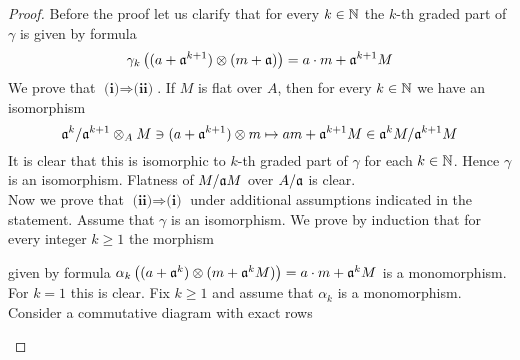 \begin{proof}
Before the proof let us clarify that for every $k\in {\mathbb N}$ the $k$-th graded part of $\gamma$ is given by formula
$$\gamma_k\left((a+\mathfrak{a}^{k+1})\otimes (m+\mathfrak{a})\right) = a\cdot m +\mathfrak{a}^{k+1}M$$
We prove that $\textbf{(i)}\Rightarrow \textbf{(ii)}$. If $M$ is flat over $A$, then for every $k\in {\mathbb N}$ we have an isomorphism 
$$\mathfrak{a}^{k}/\mathfrak{a}^{k+1}\otimes_AM\ni (a+\mathfrak{a}^{k+1})\otimes m \mapsto am+\mathfrak{a}^{k+1}M \in \mathfrak{a}^kM/\mathfrak{a}^{k+1}M$$
It is clear that this is isomorphic to $k$-th graded part of $\gamma$ for each $k\in {\mathbb N}$. Hence $\gamma$ is an isomorphism. Flatness of $M/\mathfrak{a}M$ over $A/\mathfrak{a}$ is clear.\\
Now we prove that $\textbf{(ii)}\Rightarrow \textbf{(i)}$ under additional assumptions indicated in the statement. Assume that $\gamma$ is an isomorphism. We prove by induction that for every integer $k\geq 1$ the morphism
\begin{center}
\end{center} 
given by formula $\alpha_k\left((a+\mathfrak{a}^k)\otimes (m+\mathfrak{a}^kM)\right) = a\cdot m+\mathfrak{a}^kM$ is a monomorphism. For $k=1$ this is clear. Fix $k\geq 1$ and assume that $\alpha_k$ is a monomorphism. Consider a commutative diagram with exact rows
\begin{center}
\end{center}
\end{proof}
